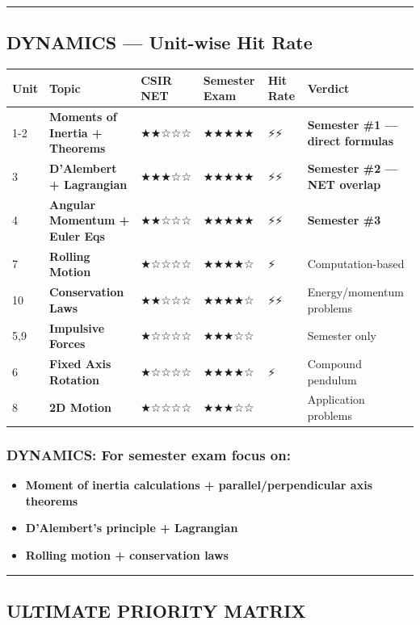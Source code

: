 \documentclass[12pt,a4paper,openany]{book}
\begin{document}
{\bigskip\noindent\rule{\textwidth}{0.4pt}\bigskip

\subsection{ DYNAMICS — Unit-wise Hit Rate}

\begin{center}
\begin{tabular}{|l|l|l|l|l|l|}
\hline
\textbf{Unit} & \textbf{Topic} & \textbf{CSIR NET} & \textbf{Semester Exam} & \textbf{Hit Rate} & \textbf{Verdict} \\
\hline
1-2 & \textbf{Moments of Inertia + Theorems} & ★★☆☆☆ & ★★★★★ & ⚡⚡ & \textbf{Semester \#1 — direct formulas} \\
\hline
3 & \textbf{D'Alembert + Lagrangian} & ★★★☆☆ & ★★★★★ & ⚡⚡ & \textbf{Semester \#2 — NET overlap} \\
\hline
4 & \textbf{Angular Momentum + Euler Eqs} & ★★☆☆☆ & ★★★★★ & ⚡⚡ & \textbf{Semester \#3} \\
\hline
7 & \textbf{Rolling Motion} & ★☆☆☆☆ & ★★★★☆ & ⚡ & Computation-based \\
\hline
10 & \textbf{Conservation Laws} & ★★☆☆☆ & ★★★★☆ & ⚡⚡ & Energy/momentum problems \\
\hline
5,9 & \textbf{Impulsive Forces} & ★☆☆☆☆ & ★★★☆☆ &  & Semester only \\
\hline
6 & \textbf{Fixed Axis Rotation} & ★☆☆☆☆ & ★★★★☆ & ⚡ & Compound pendulum \\
\hline
8 & \textbf{2D Motion} & ★☆☆☆☆ & ★★★☆☆ &  & Application problems \\
\hline
\end{tabular}
\end{center}

\subsubsection{ DYNAMICS: For semester exam focus on:}
\begin{itemize}
  \item \textbf{Moment of inertia calculations + parallel/perpendicular axis theorems}
  \item \textbf{D'Alembert's principle + Lagrangian}
  \item \textbf{Rolling motion + conservation laws}
\end{itemize}

\bigskip\noindent\rule{\textwidth}{0.4pt}\bigskip

\subsection{ ULTIMATE PRIORITY MATRIX}

}
\end{document}
